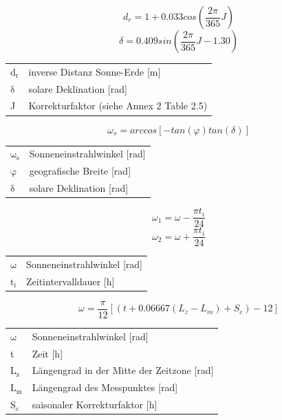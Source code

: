 \begin{appendix}
\begin{description}
\begin{equation}
\label{eq:dr}
d_r=1+0.033cos\left(\frac{2\pi}{365}J\right)
\end{equation}
\begin{equation}
\label{eq:delta_radiation}
\delta=0.409sin\left(\frac{2\pi}{365}J-1.30\right)
\end{equation}
\begin{table}[H]
\centering
\begin{tabular}{ll}
$\mathrm{d_r}$ & inverse Distanz Sonne-Erde [m]\\
$\mathrm{\delta}$ & solare Deklination [rad]\\
J & Korrekturfaktor (siehe \cite{fao} Annex 2 Table 2.5)\\
\end{tabular}
\end{table}

\begin{equation}
\label{eq:omega_s}
\omega_s=arccos[-tan(\varphi)tan(\delta)]
\end{equation}
\begin{table}[H]
\centering
\begin{tabular}{ll}
$\mathrm{\omega_s}$ & Sonneneinstrahlwinkel [rad]\\
$\mathrm{\varphi}$ & geografische Breite [rad]\\
$\mathrm{\delta}$ & solare Deklination [rad]\\
\end{tabular}
\end{table}

\begin{equation}
\label{eq:omega_i}
\omega_1=\omega-\frac{\pi t_i}{24}
\end{equation}
\begin{equation}
\omega_2=\omega+\frac{\pi t_i}{24}
\end{equation}
\begin{table}[H]
\centering
\begin{tabular}{ll}
$\mathrm{\omega}$ & Sonneneinstrahlwinkel [rad]\\
$\mathrm{t_i}$ & Zeitintervalldauer [h]\\
\end{tabular}
\end{table}

\begin{equation}
\label{eq:omega}
\omega=\frac{\pi}{12}[(t+0.06667(L_z-L_m)+S_c)-12]
\end{equation}
\begin{table}[H]
\centering
\begin{tabular}{ll}
$\mathrm{\omega}$ & Sonneneinstrahlwinkel [rad]\\
t & Zeit [h]\\
$\mathrm{L_z}$ & Längengrad in der Mitte der Zeitzone [rad]\\
$\mathrm{L_m}$ & Längengrad des Messpunktes [rad]\\
$\mathrm{S_c}$ & saisonaler Korrekturfaktor [h]\\
\end{tabular}
\end{table}


\end{description}
\end{appendix}
